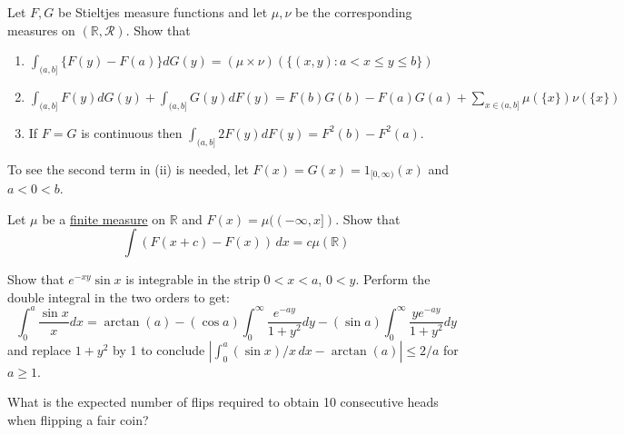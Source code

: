  \begin{exercise}[Durrett 1.7.3]
    Let $F, G$ be Stieltjes measure functions and let $\mu, \nu$ be the corresponding measures on $(\mathbb{R}, \mathcal{R})$. Show that
    \begin{enumerate}
      \item $\int_{(a, b]} \{F(y) - F(a)\} dG(y) = (\mu \times \nu)(\{(x, y) : a < x \leq y \leq b\})$
      \item $\int_{(a, b]} F(y) dG(y) + \int_{(a, b]} G(y) dF(y) = F(b)G(b) - F(a)G(a) + \sum_{x \in (a, b]} \mu(\{x\})\nu(\{x\})$
      \item If $F = G$ is continuous then $\int_{(a, b]} 2F(y) dF(y) = F^2(b) - F^2(a)$.
    \end{enumerate}
    To see the second term in (ii) is needed, let $F(x) = G(x) = 1_{[0, \infty)}(x)$ and $a < 0 < b$.
  \end{exercise}
  \begin{solution}

  \end{solution}

  \begin{exercise}[Durrett 1.7.4]
    Let $\mu$ be a \hyperref[mt-def:finite-measure]{finite measure} on $\mathbb{R}$ and $F(x) = \mu((-\infty, x])$. Show that
    \begin{equation*}
      \int (F(x + c) - F(x)) \, dx = c \mu(\mathbb{R})
    \end{equation*}
  \end{exercise}
  \begin{solution}

  \end{solution}

  \begin{exercise}[Durrett 1.7.5]
    Show that $e^{-xy} \sin x$ is integrable in the strip $0 < x < a$, $0 < y$. Perform the double integral in the two orders to get:
    \begin{equation*}
      \int_0^a \frac{\sin x}{x} dx = \arctan(a) - (\cos a) \int_0^{\infty} \frac{e^{-ay}}{1 + y^2} dy - (\sin a) \int_0^{\infty} \frac{ye^{-ay}}{1 + y^2} dy
    \end{equation*}
    and replace $1 + y^2$ by 1 to conclude $|\int_0^a (\sin x)/x \, dx - \arctan(a)| \leq 2/a$ for $a \geq 1$.
  \end{exercise}
  \begin{solution}

  \end{solution}

  \begin{exercise}
		What is the expected number of flips required to obtain 10 consecutive heads when flipping a fair coin?
  \end{exercise}
  \begin{solution}

  \end{solution}

